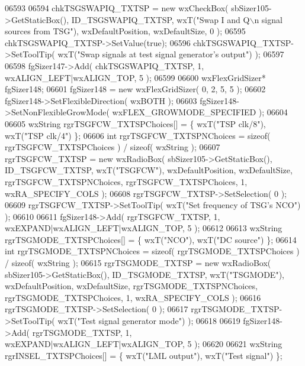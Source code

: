 \begin{DoxyCode}
06593     
06594     chkTSGSWAPIQ_TXTSP = \textcolor{keyword}{new} wxCheckBox( sbSizer105->GetStaticBox(), 
      ID_TSGSWAPIQ_TXTSP, wxT(\textcolor{stringliteral}{"Swap I and Q\(\backslash\)n signal sources from TSG"}), wxDefaultPosition, wxDefaultSize, 0 );
06595     chkTSGSWAPIQ_TXTSP->SetValue(\textcolor{keyword}{true}); 
06596     chkTSGSWAPIQ_TXTSP->SetToolTip( wxT(\textcolor{stringliteral}{"Swap signals at test signal generator's output"}) );
06597     
06598     fgSizer147->Add( chkTSGSWAPIQ_TXTSP, 1, wxALIGN\_LEFT|wxALIGN\_TOP, 5 );
06599     
06600     wxFlexGridSizer* fgSizer148;
06601     fgSizer148 = \textcolor{keyword}{new} wxFlexGridSizer( 0, 2, 5, 5 );
06602     fgSizer148->SetFlexibleDirection( wxBOTH );
06603     fgSizer148->SetNonFlexibleGrowMode( wxFLEX\_GROWMODE\_SPECIFIED );
06604     
06605     wxString rgrTSGFCW\_TXTSPChoices[] = \{ wxT(\textcolor{stringliteral}{"TSP clk/8"}), wxT(\textcolor{stringliteral}{"TSP clk/4"}) \};
06606     \textcolor{keywordtype}{int} rgrTSGFCW\_TXTSPNChoices = \textcolor{keyword}{sizeof}( rgrTSGFCW\_TXTSPChoices ) / \textcolor{keyword}{sizeof}( wxString );
06607     rgrTSGFCW_TXTSP = \textcolor{keyword}{new} wxRadioBox( sbSizer105->GetStaticBox(), 
      ID_TSGFCW_TXTSP, wxT(\textcolor{stringliteral}{"TSGFCW"}), wxDefaultPosition, wxDefaultSize, rgrTSGFCW\_TXTSPNChoices, 
      rgrTSGFCW\_TXTSPChoices, 1, wxRA\_SPECIFY\_COLS );
06608     rgrTSGFCW_TXTSP->SetSelection( 0 );
06609     rgrTSGFCW_TXTSP->SetToolTip( wxT(\textcolor{stringliteral}{"Set frequency of TSG's NCO"}) );
06610     
06611     fgSizer148->Add( rgrTSGFCW_TXTSP, 1, wxEXPAND|wxALIGN\_LEFT|wxALIGN\_TOP, 5 );
06612     
06613     wxString rgrTSGMODE\_TXTSPChoices[] = \{ wxT(\textcolor{stringliteral}{"NCO"}), wxT(\textcolor{stringliteral}{"DC source"}) \};
06614     \textcolor{keywordtype}{int} rgrTSGMODE\_TXTSPNChoices = \textcolor{keyword}{sizeof}( rgrTSGMODE\_TXTSPChoices ) / \textcolor{keyword}{sizeof}( wxString );
06615     rgrTSGMODE_TXTSP = \textcolor{keyword}{new} wxRadioBox( sbSizer105->GetStaticBox(), 
      ID_TSGMODE_TXTSP, wxT(\textcolor{stringliteral}{"TSGMODE"}), wxDefaultPosition, wxDefaultSize, rgrTSGMODE\_TXTSPNChoices, 
      rgrTSGMODE\_TXTSPChoices, 1, wxRA\_SPECIFY\_COLS );
06616     rgrTSGMODE_TXTSP->SetSelection( 0 );
06617     rgrTSGMODE_TXTSP->SetToolTip( wxT(\textcolor{stringliteral}{"Test signal generator mode"}) );
06618     
06619     fgSizer148->Add( rgrTSGMODE_TXTSP, 1, wxEXPAND|wxALIGN\_LEFT|wxALIGN\_TOP, 5 );
06620     
06621     wxString rgrINSEL\_TXTSPChoices[] = \{ wxT(\textcolor{stringliteral}{"LML output"}), wxT(\textcolor{stringliteral}{"Test signal"}) \};

\end{DoxyCode}
